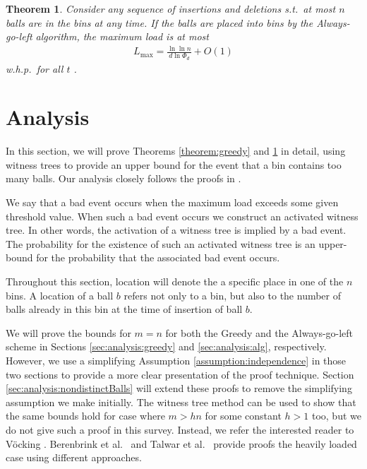 \documentclass[a4paper,12pt]{article}
\newcommand\load{L_{\mathrm{max}}}
\newtheorem{theorem}{Theorem}
\begin{document}
\begin{comment}
\begin{theorem}
\label{theorem:agln}
If $n$ balls are placed into $n$ bins using the Always-go-left scheme, the maximum load will be
\begin{align*}
\load \leq \frac{\ln\ln n}{d  \ln \Phi_d} + O(1)
\end{align*}
w.h.p.
\end{theorem}
\end{comment}

\begin{theorem}
\label{theorem:aglm}
Consider any sequence of insertions and deletions s.t.~at most $n$ balls are in the bins at any time. If the balls are placed into bins by the Always-go-left algorithm, the maximum load is at most 
\begin{align*}
\load = \frac{\ln\ln n}{d  \ln \Phi_d} + O(1)
\end{align*}
w.h.p.~for all $t$ \cite{VOC03}.
\end{theorem}

\section{Analysis}
\label{sec:analysis}
In this section, we will prove Theorems \ref{theorem:greedy} and \ref{theorem:aglm} in detail, using witness trees to provide an upper bound for the event that a bin contains too many balls. Our analysis closely follows the proofs in \cite{VOC03}.

We say that a bad event occurs when the maximum load exceeds some given threshold value. When such a bad event occurs we construct an activated witness tree. In other words, the activation of a witness tree is implied by a bad event. The probability for the existence of such an activated witness tree is an upper-bound for the probability that the associated bad event occurs.

Throughout this section, location will denote the a specific place in one of the $n$ bins. A location of a ball $b$ refers not only to a bin, but also to the number of balls already in this bin at the time of insertion of ball $b$.

We will prove the bounds for $m=n$ for both the Greedy and the Always-go-left scheme in Sections \ref{sec:analysis:greedy} and \ref{sec:analysis:alg}, respectively. However, we use a simplifying Assumption \ref{assumption:independence} in those two sections to provide a more clear presentation of the proof technique. Section \ref{sec:analysis:nondistinctBalls} will extend these proofs to remove the simplifying assumption we make initially. The witness tree method can be used to show that the same bounds hold for case where $m > h n$ for some constant $h > 1$ too, but we do not give such a proof in this survey. Instead, we refer the interested reader to V\"ocking \cite{VOC03}. Berenbrink et al.~\cite{BCSV06} and Talwar et al.~\cite{TW13} provide proofs the heavily loaded case using different approaches.
\end{document}

